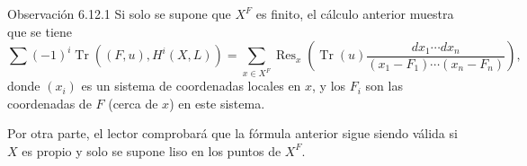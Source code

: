 \begin{statement}{Observación 6.12.1}
Si solo se supone que $X^F$ es finito, el cálculo anterior muestra que se tiene
\[
\sum(-1)^i\operatorname{Tr}((F,u),H^i(X,L))=
\sum_{x\in X^F}\operatorname{Res}_x\left(\operatorname{Tr}(u)\frac{dx_1\cdots dx_n}{(x_1-F_1)\cdots(x_n-F_n)}\right),
\]
donde $(x_i)$ es un sistema de coordenadas locales en $x$, y los $F_i$ son las coordenadas de $F$ (cerca de $x$) en este sistema.

Por otra parte, el lector comprobará que la fórmula anterior sigue siendo válida si $X$ es propio y solo se supone liso en los puntos de $X^F$.
\end{statement}

